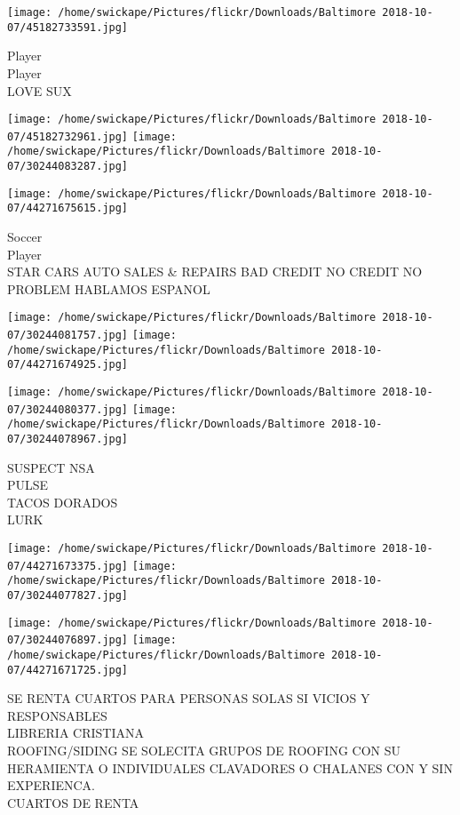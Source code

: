 \documentclass[10pt,letterpaper]{article}
\begin{document}
\vspace{0.25in}
\texttt{[image: /home/swickape/Pictures/flickr/Downloads/Baltimore 2018-10-07/45182733591.jpg]}

Player\\
Player\\
LOVE SUX\\
\pagebreak

\texttt{[image: /home/swickape/Pictures/flickr/Downloads/Baltimore 2018-10-07/45182732961.jpg]}
\texttt{[image: /home/swickape/Pictures/flickr/Downloads/Baltimore 2018-10-07/30244083287.jpg]}

\vspace{0.25in}
\texttt{[image: /home/swickape/Pictures/flickr/Downloads/Baltimore 2018-10-07/44271675615.jpg]}

Soccer\\
Player\\
STAR CARS AUTO SALES \& REPAIRS BAD CREDIT NO CREDIT NO PROBLEM HABLAMOS ESPANOL\\
\pagebreak

\texttt{[image: /home/swickape/Pictures/flickr/Downloads/Baltimore 2018-10-07/30244081757.jpg]}
\texttt{[image: /home/swickape/Pictures/flickr/Downloads/Baltimore 2018-10-07/44271674925.jpg]}

\texttt{[image: /home/swickape/Pictures/flickr/Downloads/Baltimore 2018-10-07/30244080377.jpg]}
\texttt{[image: /home/swickape/Pictures/flickr/Downloads/Baltimore 2018-10-07/30244078967.jpg]}

SUSPECT NSA\\
PULSE\\
TACOS DORADOS\\
LURK\\
\pagebreak

\texttt{[image: /home/swickape/Pictures/flickr/Downloads/Baltimore 2018-10-07/44271673375.jpg]}
\texttt{[image: /home/swickape/Pictures/flickr/Downloads/Baltimore 2018-10-07/30244077827.jpg]}

\texttt{[image: /home/swickape/Pictures/flickr/Downloads/Baltimore 2018-10-07/30244076897.jpg]}
\texttt{[image: /home/swickape/Pictures/flickr/Downloads/Baltimore 2018-10-07/44271671725.jpg]}

SE RENTA CUARTOS PARA PERSONAS SOLAS SI VICIOS Y RESPONSABLES\\
LIBRERIA CRISTIANA\\
ROOFING/SIDING SE SOLECITA GRUPOS DE ROOFING CON SU HERAMIENTA O INDIVIDUALES CLAVADORES O CHALANES CON Y SIN EXPERIENCA.\\
CUARTOS DE RENTA\\
\pagebreak
\end{document}
